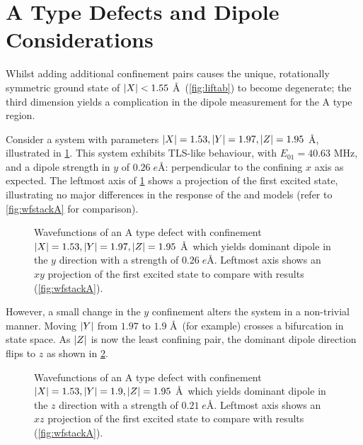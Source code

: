 \section{A Type Defects and Dipole Considerations}\label{sec:atype3d}

Whilst adding additional confinement pairs causes the unique, rotationally symmetric ground state of $\lvert X\rvert < 1.55$ \AA\ (\cref{fig:liftab}) to become degenerate; the third dimension yields a complication in the dipole measurement for the A type region.

Consider a system with parameters $\lvert X\rvert = 1.53, \lvert Y\rvert = 1.97, \lvert Z\rvert = 1.95$ \AA, illustrated in \cref{fig:atypey}.
This system exhibits TLS-like behaviour, with $E_{01} = 40.63$ MHz, and a dipole strength in $y$ of $0.26 \; e$\AA: perpendicular to the confining $x$ axis as expected.
The leftmost axis of \cref{fig:atypey} shows a  projection of the first excited state, illustrating no major differences in the response of the  and  models (refer to \cref{fig:wfstackA} for comparison).

\begin{figure}[htp]
  \resizebox{\textwidth}{!}{}
  \caption[B Type Defect in \textit{y}]{\label{fig:atypey}Wavefunctions of an A type defect with confinement $\lvert X\rvert = 1.53, \lvert Y\rvert = 1.97, \lvert Z\rvert = 1.95$ \AA\ which yields dominant dipole in the $y$ direction with a strength of $0.26 \; e$\AA. Leftmost axis shows an $xy$ projection of the first excited state to compare with  results (\cref{fig:wfstackA}).}
\end{figure}

However, a small change in the $y$ confinement alters the system in a non-trivial manner.
Moving $\lvert Y\rvert$ from $1.97$ to $1.9$ \AA\ (for example) crosses a bifurcation in state space.
As $\lvert Z\rvert$ is now the least confining pair, the dominant dipole direction flips to $z$ as shown in \cref{fig:atypez}.

\begin{figure}[htb]
  \resizebox{\textwidth}{!}{}
  \caption[B Type Defect in \textit{z}]{\label{fig:atypez}Wavefunctions of an A type defect with confinement $\lvert X\rvert = 1.53, \lvert Y\rvert = 1.9, \lvert Z\rvert = 1.95$ \AA\ which yields dominant dipole in the $z$ direction with a strength of $0.21 \; e$\AA. Leftmost axis shows an $xz$ projection of the first excited state to compare with  results (\cref{fig:wfstackA}).}
\end{figure}

